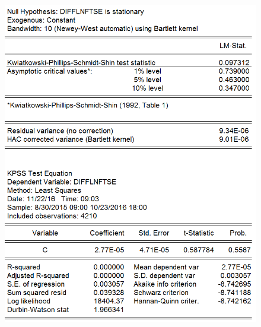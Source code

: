 \documentclass[11pt]{report}
\begin{document}
\begin{figure}[!h]
\begin{minipage}[c]{.46\linewidth}
\includegraphics[scale=0.5]{Appendix/chap2/12}
\end{minipage} \hfill
\begin{minipage}[c]{.46\linewidth}

\end{minipage}
\end{figure}
\end{document}
